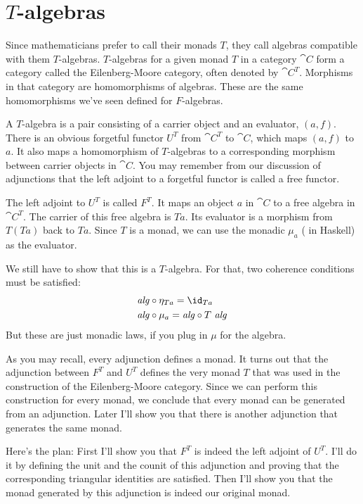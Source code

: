 \section{$T$-algebras}

Since mathematicians prefer to call their monads $T$, they call
algebras compatible with them $T$-algebras. $T$-algebras for a given monad $T$
in a category $\cat{C}$ form a category called the Eilenberg-Moore
category, often denoted by $\cat{C}^T$. Morphisms in that
category are homomorphisms of algebras. These are the same homomorphisms
we've seen defined for $F$-algebras.

A $T$-algebra is a pair consisting of a carrier object and an evaluator,
$(a, f)$. There is an obvious forgetful functor $U^T$ from
$\cat{C}^T$ to $\cat{C}$, which maps $(a, f)$ to $a$. It
also maps a homomorphism of $T$-algebras to a corresponding morphism
between carrier objects in $\cat{C}$. You may remember from our discussion of
adjunctions that the left adjoint to a forgetful functor is called a
free functor.

The left adjoint to $U^T$ is called $F^T$. It maps an object
$a$ in $\cat{C}$ to a free algebra in $\cat{C}^T$. The carrier
of this free algebra is $T a$. Its evaluator is a morphism from
$T (T a)$ back to $T a$. Since $T$ is a monad,
we can use the monadic $\mu_a$ ( in Haskell) as the
evaluator.

We still have to show that this is a $T$-algebra. For that, two coherence
conditions must be satisfied:
\begin{align*}
  \mathit{alg} & \circ \eta_{Ta} = \id_{Ta}     \\
  \mathit{alg} & \circ \mu_a = \mathit{alg} \circ T\ \mathit{alg}
\end{align*}
But these are just monadic laws, if you plug in $\mu$ for the
algebra.

As you may recall, every adjunction defines a monad. It turns out that
the adjunction between $F^T$ and $U^T$
defines the very monad $T$ that was used in the construction of
the Eilenberg-Moore category. Since we can perform this construction for
every monad, we conclude that every monad can be generated from an
adjunction. Later I'll show you that there is another adjunction that
generates the same monad.

Here's the plan: First I'll show you that $F^T$ is indeed the left
adjoint of $U^T$. I'll do it by defining the unit and the counit
of this adjunction and proving that the corresponding triangular
identities are satisfied. Then I'll show you that the monad generated by
this adjunction is indeed our original monad.

